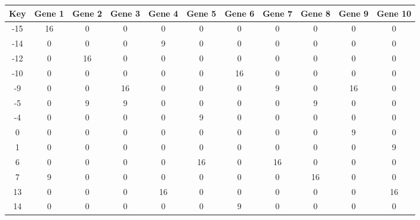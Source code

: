 \begin{tabular}{|c|c|c|c|c|c|c|c|c|c|c|}
\hline
Key & Gene 1 & Gene 2 & Gene 3 & Gene 4 & Gene 5 & Gene 6 & Gene 7 & Gene 8 & Gene 9 & Gene 10 \\
\hline
-15 & 16 & 0 & 0 & 0 & 0 & 0 & 0 & 0 & 0 & 0 \\
-14 & 0 & 0 & 0 & 9 & 0 & 0 & 0 & 0 & 0 & 0 \\
-12 & 0 & 16 & 0 & 0 & 0 & 0 & 0 & 0 & 0 & 0 \\
-10 & 0 & 0 & 0 & 0 & 0 & 16 & 0 & 0 & 0 & 0 \\
-9 & 0 & 0 & 16 & 0 & 0 & 0 & 9 & 0 & 16 & 0 \\
-5 & 0 & 9 & 9 & 0 & 0 & 0 & 0 & 9 & 0 & 0 \\
-4 & 0 & 0 & 0 & 0 & 9 & 0 & 0 & 0 & 0 & 0 \\
0 & 0 & 0 & 0 & 0 & 0 & 0 & 0 & 0 & 9 & 0 \\
1 & 0 & 0 & 0 & 0 & 0 & 0 & 0 & 0 & 0 & 9 \\
6 & 0 & 0 & 0 & 0 & 16 & 0 & 16 & 0 & 0 & 0 \\
7 & 9 & 0 & 0 & 0 & 0 & 0 & 0 & 16 & 0 & 0 \\
13 & 0 & 0 & 0 & 16 & 0 & 0 & 0 & 0 & 0 & 16 \\
14 & 0 & 0 & 0 & 0 & 0 & 9 & 0 & 0 & 0 & 0 \\
\hline
\end{tabular}